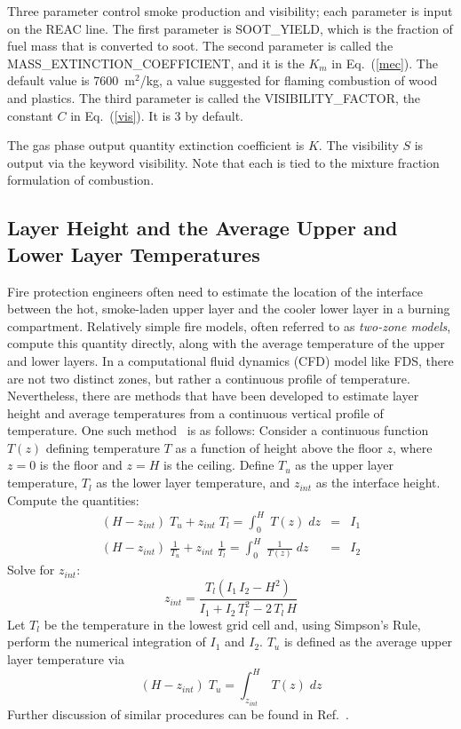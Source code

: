 \documentclass[11pt]{book}
\newcommand{\be}{\begin{equation}}
\newcommand{\ee}{\end{equation}}
\begin{document}
Three parameter control smoke production and visibility; each
parameter is input on the {\ct REAC} line. The first parameter
is {\ct SOOT\_YIELD}, which is the fraction of fuel mass that
is converted to soot. The second parameter is called the
{\ct MASS\_EXTINCTION\_COEFFICIENT}, and it is the $K_m$ in
Eq.~(\ref{mec}). The default value is 7600~m$^2$/kg, a value
suggested for flaming combustion of wood and plastics.
The third parameter is called the {\ct VISIBILITY\_FACTOR}, the
constant $C$ in Eq.~(\ref{vis}). It is 3 by default.

The gas phase output quantity {\ct extinction coefficient} is $K$.
The visibility $S$ is output via the keyword {\ct visibility}. Note
that each is tied to the mixture fraction formulation of combustion.


\subsection{Layer Height and the Average Upper and Lower Layer Temperatures}
\label{info:layerheight}

Fire protection engineers often need to estimate the location of the interface between
the hot, smoke-laden upper layer and the cooler lower layer in a burning compartment.
Relatively simple fire models, often referred to as {\em two-zone models}, compute
this quantity directly, along with the average temperature of the upper and lower layers.
In a computational fluid dynamics (CFD) model like FDS, there are not two distinct zones,
but rather a continuous profile of temperature. Nevertheless, there are methods that
have been developed to estimate layer height and average temperatures from a continuous
vertical profile of temperature. One such method~\cite{Janssens:JFS1992} is as follows:
Consider a continuous function $T(z)$ defining temperature $T$ as a function of height above
the floor $z$, where $z=0$ is the floor and $z=H$ is the ceiling. Define $T_u$ as the
upper layer temperature, $T_l$ as the lower layer temperature, and $z_{int}$ as the
interface height. Compute the quantities:
\begin{eqnarray*} (H-z_{int})\; T_u + z_{int} \; T_l = \int_0^H \; T(z) \; dz &=& I_1 \\
                  (H-z_{int})\; \frac{1}{T_u} + z_{int} \; \frac{1}{T_l} = \int_0^H \; \frac{1}{T(z)} \; dz &=& I_2 \end{eqnarray*}
Solve for $z_{int}$:
\be z_{int} = \frac{ T_l(I_1 \, I_2 - H^2)}{I_1+I_2 \, T_l^2 - 2\, T_l \, H} \ee
Let $T_l$ be the temperature in the lowest grid cell and, using Simpson's Rule, perform the
numerical integration of $I_1$ and $I_2$. $T_u$ is defined as the average upper layer
temperature via
\be (H-z_{int})\; T_u = \int_{z_{int}}^H \; T(z) \; dz \ee
Further discussion of similar procedures can be found in Ref.~\cite{He:1}.
\end{document}
